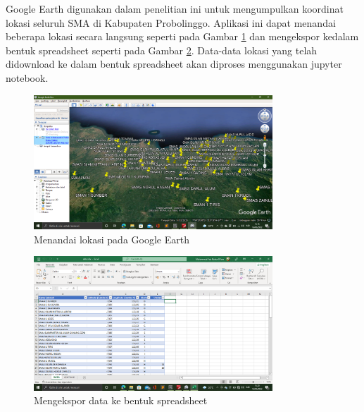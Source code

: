 \begin{enumerate}
	Google Earth digunakan dalam penelitian ini untuk mengumpulkan koordinat lokasi seluruh SMA di Kabupaten Probolinggo. Aplikasi ini dapat menandai beberapa lokasi secara langsung seperti pada Gambar \ref{fig:markloc} dan mengekspor kedalam bentuk spreadsheet seperti pada Gambar \ref{fig:eksspread}. Data-data lokasi yang telah didownload ke dalam bentuk spreadsheet akan diproses menggunakan jupyter notebook.

\begin{figure}[H]
  \centering
  \includegraphics[width=0.8\textwidth]{Gambar/google earth.png}
  \caption{Menandai lokasi pada Google Earth}
  \label{fig:markloc}
\end{figure}

\begin{figure}[H]
  \centering
  \includegraphics[width=0.8\textwidth]{Gambar/ekspor spreadsheet.png}
  \caption{Mengekspor data ke bentuk spreadsheet}
  \label{fig:eksspread}
\end{figure}

\end{enumerate}

